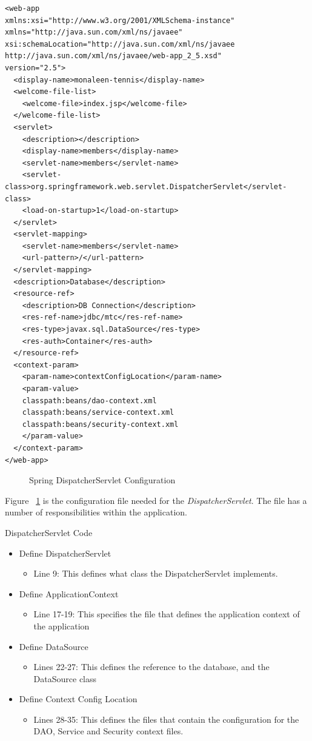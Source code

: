 \begin{lstlisting}
<web-app 
xmlns:xsi="http://www.w3.org/2001/XMLSchema-instance" 
xmlns="http://java.sun.com/xml/ns/javaee" 
xsi:schemaLocation="http://java.sun.com/xml/ns/javaee http://java.sun.com/xml/ns/javaee/web-app_2_5.xsd" 
version="2.5">
  <display-name>monaleen-tennis</display-name>
  <welcome-file-list>
    <welcome-file>index.jsp</welcome-file>
  </welcome-file-list>
  <servlet>
    <description></description>
    <display-name>members</display-name>
    <servlet-name>members</servlet-name>
    <servlet-class>org.springframework.web.servlet.DispatcherServlet</servlet-class>
    <load-on-startup>1</load-on-startup>
  </servlet>
  <servlet-mapping>
    <servlet-name>members</servlet-name>
    <url-pattern>/</url-pattern>
  </servlet-mapping>
  <description>Database</description>
  <resource-ref>
    <description>DB Connection</description>
    <res-ref-name>jdbc/mtc</res-ref-name>
    <res-type>javax.sql.DataSource</res-type>
    <res-auth>Container</res-auth>
  </resource-ref>
  <context-param>
    <param-name>contextConfigLocation</param-name>
    <param-value>
	classpath:beans/dao-context.xml
	classpath:beans/service-context.xml
	classpath:beans/security-context.xml
	</param-value>
  </context-param>
</web-app>
\end{lstlisting}
\begin{figure}[H]
\caption{Spring DispatcherServlet Configuration}
\label{fig:webxml}
\end{figure}

Figure ~\ref{fig:webxml} is the configuration file needed for the \textit{DispatcherServlet}. The file has a number of responsibilities within the application.

\begin{table}[H]
\caption{DispatcherServlet Code}
\begin{itemize}
\item Define DispatcherServlet
\begin{itemize}
\item Line 9: This defines what class the DispatcherServlet implements.
\end{itemize}
\item Define ApplicationContext
\begin{itemize}
\item Line 17-19: This specifies the file that defines the application context of the application
\end{itemize}
\item Define DataSource
\begin{itemize}
\item Lines 22-27: This defines the reference to the database, and the DataSource class
\end{itemize}
\item Define Context Config Location
\begin{itemize}
\item Lines 28-35: This defines the files that contain the configuration for the DAO, Service and Security context files.
\end{itemize}
\end{itemize}
\label{fig:webxmlExplain}
\end{table}

